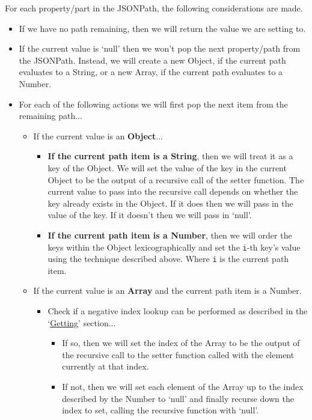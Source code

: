 \documentclass[12pt, letterpaper]{article}
\begin{document}
\begin{center}
    For each property/part in the JSONPath, the following considerations are made.
    \begin{itemize}
        \item If we have no path remaining, then we will return the value we are setting to.
        \item If the current value is `null' then we won't pop the next property/path from the JSONPath. Instead, we will create a new Object, if the current path evaluates to a String, or a new Array, if the current path evaluates to a Number.
        \item For each of the following actions we will first pop the next item from the remaining path...
        \begin{itemize}
            \item If the current value is an \textbf{Object}...
            \begin{itemize}
                \item \textbf{If the current path item is a String}, then we will treat it as a key of the Object. We will set the value of the key in the current Object to be the output of a recursive call of the setter function. The current value to pass into the recursive call depends on whether the key already exists in the Object. If it does then we will pass in the value of the key. If it doesn't then we will pass in `null'.
                \item \textbf{If the current path item is a Number}, then we will order the keys within the Object lexicographically and set the \verb|i|-th key's value using the technique described above. Where \verb|i| is the current path item.
            \end{itemize}
            \item If the current value is an \textbf{Array} and the current path item is a Number.
            \begin{itemize}
                \item Check if a negative index lookup can be performed as described in the `\hyperref[sec:jsonpath-getting]{Getting}' section...
                \begin{itemize}
                    \item If so, then we will set the index of the Array to be the output of the recursive call to the setter function called with the element currently at that index.
                    \item If not, then we will set each element of the Array up to the index described by the Number to `null' and finally recurse down the index to set, calling the recursive function with `null'.

\end{itemize}
\end{itemize}
\end{itemize}
\end{itemize}
\end{center}
\end{document}

